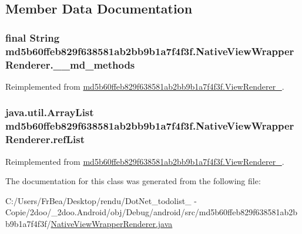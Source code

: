 \subsection{Member Data Documentation}
\hypertarget{classmd5b60ffeb829f638581ab2bb9b1a7f4f3f_1_1_native_view_wrapper_renderer_547a83f65da27218233c777a2e72959f}{
\subsubsection[{\_\-\_\-md\_\-methods}]{\setlength{\rightskip}{0pt plus 5cm}final String {\bf md5b60ffeb829f638581ab2bb9b1a7f4f3f.NativeViewWrapperRenderer.\_\-\_\-md\_\-methods}}}
\label{classmd5b60ffeb829f638581ab2bb9b1a7f4f3f_1_1_native_view_wrapper_renderer_547a83f65da27218233c777a2e72959f}




Reimplemented from \hyperlink{classmd5b60ffeb829f638581ab2bb9b1a7f4f3f_1_1_view_renderer__2_80b609e3e4054c380887d4dc2907a875}{md5b60ffeb829f638581ab2bb9b1a7f4f3f.ViewRenderer\_}.\hypertarget{classmd5b60ffeb829f638581ab2bb9b1a7f4f3f_1_1_native_view_wrapper_renderer_5e5809773a320b8a5d5e350c994525af}{
\subsubsection[{refList}]{\setlength{\rightskip}{0pt plus 5cm}java.util.ArrayList {\bf md5b60ffeb829f638581ab2bb9b1a7f4f3f.NativeViewWrapperRenderer.refList}}}
\label{classmd5b60ffeb829f638581ab2bb9b1a7f4f3f_1_1_native_view_wrapper_renderer_5e5809773a320b8a5d5e350c994525af}




Reimplemented from \hyperlink{classmd5b60ffeb829f638581ab2bb9b1a7f4f3f_1_1_view_renderer__2_6c151401977148a92c515e9c7de1aaf8}{md5b60ffeb829f638581ab2bb9b1a7f4f3f.ViewRenderer\_}.

The documentation for this class was generated from the following file:\begin{CompactItemize}
\item 
C:/Users/FrBea/Desktop/rendu/DotNet\_\-todolist\_ - Copie/2doo/\_\-2doo.Android/obj/Debug/android/src/md5b60ffeb829f638581ab2bb9b1a7f4f3f/\hyperlink{_native_view_wrapper_renderer_8java}{NativeViewWrapperRenderer.java}\end{CompactItemize}
